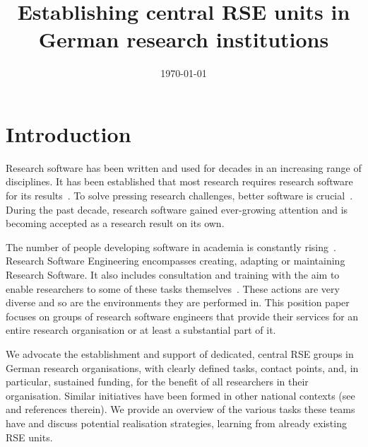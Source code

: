 \documentclass[a4paper]{article}
\title{Establishing central RSE units in German research institutions}
\date{\today}
\begin{document}
\maketitle


\section{Introduction}
Research software has been written and used for decades in an increasing range of disciplines.
It has been established that most research requires research software for its results~\autocite{Hannay2009, Hettrick2015}.
To solve pressing research challenges, better software is crucial~\autocite{Goble2014}.
During the past decade, research software gained ever-growing attention and is becoming accepted as a research result on its own.

The number of people developing software in academia is constantly rising~\autocite{Hannay2009, Hettrick2015}.
Research Software Engineering encompasses creating, adapting or maintaining Research Software.
It also includes consultation and training with the aim to enable researchers to some of these tasks themselves~\autocite{goth_foundational_competencies_2024}.
These actions are very diverse and so are the environments they are performed in.
This position paper focuses on groups of research software engineers that provide their services for an entire research organisation or at least a substantial part of it.

We advocate the establishment and support of dedicated, central RSE groups in German research organisations, with clearly defined tasks, contact points, and, in particular, sustained funding, for the benefit of all researchers in their organisation.
Similar initiatives have been formed in other national contexts (see~\autocite{barkerkatz2024,martin2023} and references therein).
We provide an overview of the various tasks these teams have and discuss potential realisation strategies, learning from already existing RSE units.
\end{document}
